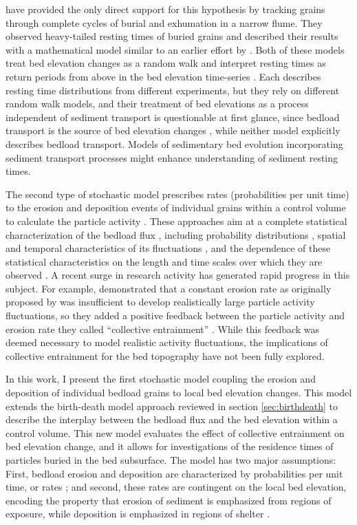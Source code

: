 \citet{Martin2014} have provided the only direct support for this hypothesis by tracking grains through complete cycles of burial and exhumation in a narrow flume.
They observed heavy-tailed resting times of buried grains and described their results with a mathematical model similar to an earlier effort by \citet{Voepel2013}.
Both of these models treat bed elevation changes as a random walk and interpret resting times as return periods from above in the bed elevation time-series \citep{Redner2007}.
Each describes resting time distributions from different experiments, but they rely on different random walk models, and their treatment of bed elevations as a process independent of sediment transport is questionable at first glance, since bedload transport is the source of bed elevation changes \citep{Wong2007}, while neither model explicitly describes bedload transport.
Models of sedimentary bed evolution incorporating sediment transport processes might enhance understanding of sediment resting times.

The second type of stochastic model prescribes rates (probabilities per unit time) to the erosion and deposition events of individual grains within a control volume to calculate the particle activity \citep{Einstein1950}.
These approaches aim at a complete statistical characterization of the bedload flux \citep{Furbish2012a,Fathel2015,Furbish2017,Heyman2016}, including probability distributions \citep{Ancey2006,Ancey2008}, spatial and temporal characteristics of its fluctuations \citep{Heyman2014a, Roseberry2012,Dhont2018}, and the dependence of these statistical characteristics on the length and time scales over which they are observed \citep{Singh2009,Singh2012,Saletti2015}.
A recent surge in research activity has generated rapid progress in this subject. 
For example, \citet{Ancey2006} demonstrated that a constant erosion rate as originally proposed by \citet{Einstein1950} was insufficient to develop realistically large particle activity fluctuations, so they added a positive feedback between the particle activity and erosion rate they called ``collective entrainment'' \citep{Ancey2008, Heyman2013,Heyman2014, Lee2018}.
While this feedback was deemed necessary to model realistic activity fluctuations, the implications of collective entrainment for the bed topography have not been fully explored.

In this work, I present the first stochastic model coupling the erosion and deposition of individual bedload grains to local bed elevation changes.
This model extends the birth-death model approach reviewed in section \ref{sec:birthdeath} to describe the interplay between the bedload flux and the bed elevation within a control volume.
This new model evaluates the effect of collective entrainment on bed elevation change, and it allows for investigations of the residence times of particles buried in the bed subsurface.
The model has two major assumptions: First, bedload erosion and deposition are characterized by probabilities per unit time, or rates \citep{Einstein1950, Ancey2008}; and second, these rates are contingent on the local bed elevation, encoding the property that erosion of sediment is emphasized from regions of exposure, while deposition is emphasized in regions of shelter \citep{Sawai1987, Wong2007}.

